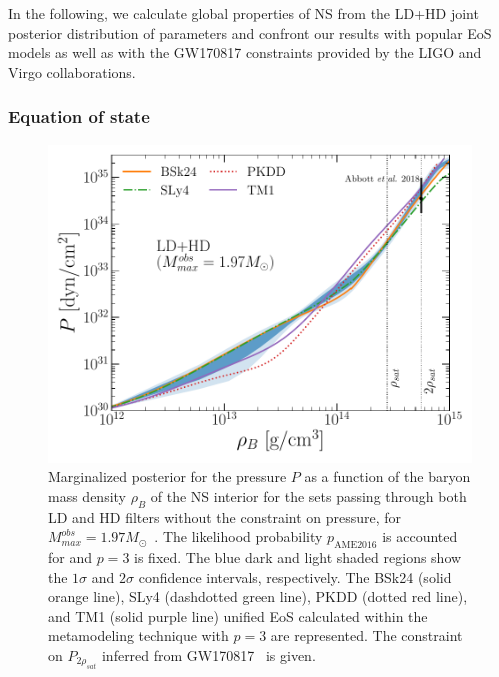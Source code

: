 In the following, we calculate global properties of NS from the LD+HD joint 
posterior distribution of parameters and confront our results with popular EoS 
models as well as with the GW170817 constraints provided by the LIGO and Virgo 
collaborations.

\subsubsection{Equation of state} %

\begin{figure}[!t]
\begin{center}
  \includegraphics[width=0.9\linewidth]{figures/eos_bayes.pdf}
\end{center}
\caption[Posterior equation of state confronted with popular models and 
the GW170817 event]{Marginalized posterior for the pressure 
  $P$ as a function of the baryon mass density $\rho_B$ of the NS interior for 
  the sets passing through both LD and HD filters without the constraint on 
  pressure, for $M_{max}^{obs} = 1.97M_\odot$~\cite{Antoniadis2013}. The 
  likelihood probability $p_{\text{AME2016}}$ is accounted for and $p=3$ is 
  fixed. The blue dark and light shaded regions show the $1\sigma$ and $2\sigma$ 
  confidence intervals, respectively. The BSk24 (solid orange line), SLy4
  (dashdotted green line), PKDD (dotted red line), and TM1 (solid purple line) 
  unified EoS calculated within the metamodeling technique with $p=3$ are 
  represented. The constraint on $P_{2\rho_{sat}}$ inferred from 
  GW170817~\cite{GW1} is given.}\label{fig:eos_bayes}
\end{figure}

